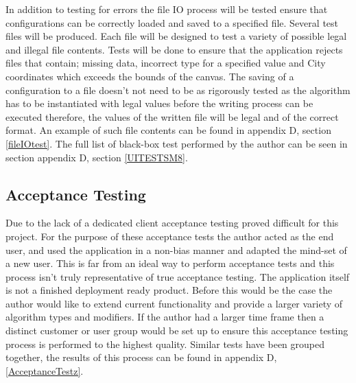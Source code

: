 In addition to testing for errors the file IO process will be tested ensure that configurations can be correctly loaded and saved to a specified file. Several test files will be produced. Each file will be designed to test a variety of possible legal and illegal file contents. Tests will be done to ensure that the application rejects files that contain; missing data, incorrect type for a specified value and City coordinates which exceeds the bounds of the canvas. The saving of a configuration to a file doesn’t not need to be as rigorously tested as the algorithm has to be instantiated with legal values before the writing process can be executed therefore, the values of the written file will be legal and of the correct format. An example of such file contents can be found in appendix D, section \ref{fileIOtest}. The full list of black-box test performed by the author can be seen in section appendix D, section \ref{UITESTSM8}.

\subsection{Acceptance Testing}

Due to the lack of a dedicated client acceptance testing proved difficult for this project. For the purpose of these acceptance tests the author acted as the end user, and used the application in a non-bias manner and adapted the mind-set of a new user. This is far from an ideal way to perform acceptance tests and this process isn’t truly representative of true acceptance testing. The application itself is not a finished deployment ready product. Before this would be the case the author would like to extend current functionality and provide a larger variety of algorithm types and modifiers. If the author had a larger time frame then a distinct customer or user group would be set up to ensure this acceptance testing process is performed to the highest quality. Similar tests have been grouped together, the results of this process can be found in appendix D, \ref{AcceptanceTestz}.